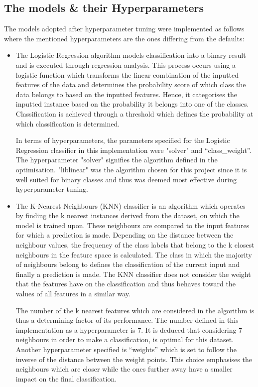 \documentclass{l4proj}
\begin{document}
\subsection{The models \& their Hyperparameters}
The models adopted after hyperparameter tuning were implemented as follows where the mentioned hyperparameters are the ones differing from the defaults:
\begin{itemize}

\item The Logistic Regression algorithm models classification into a binary result and is executed through regression analysis. This process occurs using a logistic function which transforms the linear combination of the inputted features of the data and determines the probability score of which class the data belongs to based on the inputted features. Hence, it categorises the inputted instance based on the probability it belongs into one of the classes. Classification is achieved through a threshold which defines the probability at which classification is determined.

In terms of hyperparameters, the parameters specified for the Logistic Regression classifier in this implementation were "solver" and “class\_weight”. 
The hyperparameter "solver" signifies the algorithm defined in the optimisation. "liblinear" was the algorithm chosen for this project since it is well suited for binary classes and thus was deemed most effective during hyperparameter tuning. 

\item The K-Nearest Neighbours (KNN) classifier is an algorithm which operates by finding the k nearest instances derived from the dataset, on which the model is trained upon. These neighbours are compared to the input features for which a prediction is made. Depending on the distance between the neighbour values, the frequency of the class labels that belong to the k closest neighbours in the feature space is calculated. The class in which the majority of neighbours belong to defines the classification of the current input and finally a prediction is made. The KNN classifier does not consider the weight that the features have on the classification and thus behaves toward the values of all features in a similar way.

The number of the k nearest features which are considered in the algorithm is thus a determining factor of its performance. The number defined in this implementation as a hyperparameter is 7. It is deduced that considering 7 neighbours in order to make a classification, is optimal for this dataset. Another hyperparameter specified is “weights” which is set to follow the inverse of the distance between the weight points. This choice emphasises the neighbours which are closer while the ones further away have a smaller impact on the final classification.  



\end{itemize}
\end{document}
